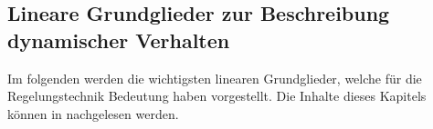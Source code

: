 \subsection{Lineare Grundglieder zur Beschreibung dynamischer Verhalten}
%
Im folgenden werden die wichtigsten linearen Grundglieder, welche für die Regelungstechnik Bedeutung haben vorgestellt. Die Inhalte dieses Kapitels können in \cite{Foellinger94, Unbehauen08, MSF05, Lunze10} nachgelesen werden.
%
